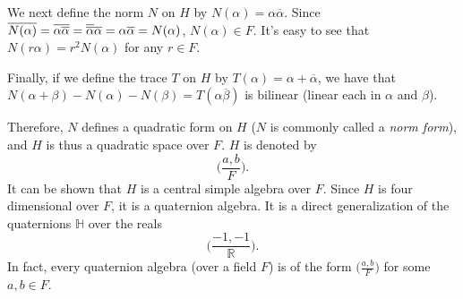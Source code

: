 \documentclass[12pt]{article}
\begin{document}
We next define the norm $N$ on $H$ by $N(\alpha)=\alpha\overline{\alpha}$.  Since $\overline{N(\alpha)}=\overline{\alpha\overline{\alpha}}=
\overline{\overline{\alpha}}\space \overline{\alpha}=\alpha\overline{\alpha}=N(\alpha)$, $N(\alpha)\in F$.  It's easy to see that $N(r\alpha)=r^2N(\alpha)$ for any $r\in F$.

Finally, if we define the trace $T$ on $H$ by $T(\alpha)=\alpha+ \overline{\alpha}$, we have that $N(\alpha+\beta)-N(\alpha)-N(\beta)=T(\alpha \overline{\beta})$ is bilinear (linear each in $\alpha$ and $\beta$).

Therefore, $N$ defines a quadratic form on $H$ ($N$ is commonly called a \emph{norm form}), and $H$ is thus a quadratic space over $F$.  $H$ is denoted by $$\Big( \frac{a,b}{F} \Big).$$
It can be shown that $H$ is a central simple algebra over $F$.  Since $H$ is four dimensional over $F$, it is a quaternion algebra.  It is a direct generalization of the quaternions $\mathbb{H}$ over the reals 
$$\Big( \frac{-1,-1}{\mathbb{R}} \Big).$$
In fact, every quaternion algebra (over a field $F$) is of the form $\displaystyle{\Big( \frac{a,b}{F} \Big)}$ for some $a,b\in F$.
\end{document}

